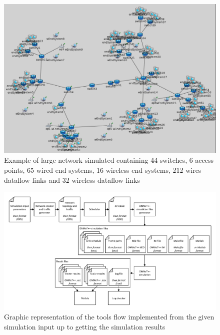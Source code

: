 \documentclass[conference]{IEEEtran}
\begin{document}







\begin{figure}[h]
	\centerline{\includegraphics[keepaspectratio=true, width=16cm] {figures/s1-3}}
	\caption{Example of large network simulated containing 44 switches, 6 access points, 65 wired end systems, 16 wireless end systems, 212 wires dataflow links and 32 wireless dataflow links}
	\label{fig:s1-3}
\end{figure}

\begin{figure}[h]
	\centerline{\includegraphics[keepaspectratio=true, width=16cm] {figures/toolchain-architecture}}
	\caption{Graphic representation of the tools flow implemented from the given simulation input up to getting the simulation results}
	\label{fig:toolchain-architecture}
\end{figure}
\end{document}

